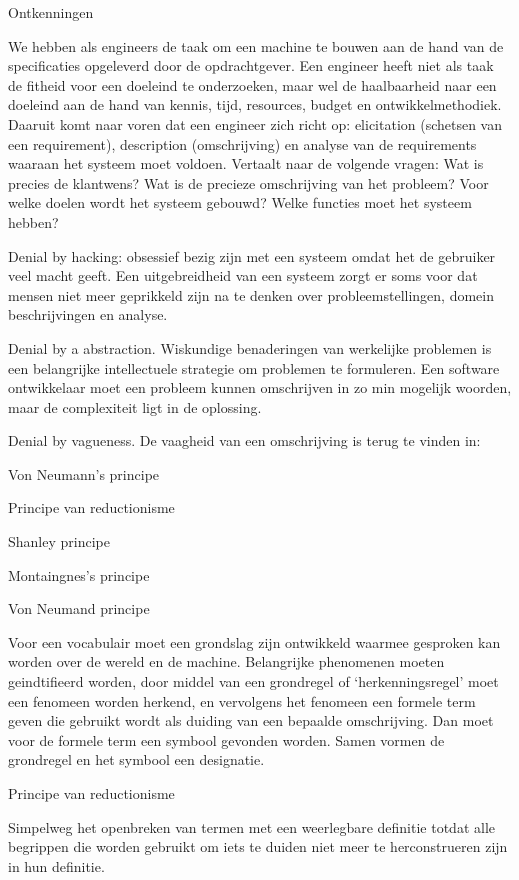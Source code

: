 Ontkenningen 

We hebben als engineers de taak om een machine te bouwen aan de hand van de specificaties opgeleverd door de opdrachtgever. Een engineer heeft niet als taak de fitheid voor een doeleind te onderzoeken, maar wel de haalbaarheid naar een doeleind aan de hand van kennis, tijd, resources, budget en ontwikkelmethodiek. Daaruit komt naar voren dat een engineer zich richt op: elicitation (schetsen van een requirement), description (omschrijving) en analyse van de requirements waaraan het systeem moet voldoen. Vertaalt naar de volgende vragen: Wat is precies de klantwens?  Wat is de precieze omschrijving van het probleem? Voor welke doelen wordt het systeem gebouwd? Welke functies moet het systeem hebben? 

Denial by hacking: obsessief bezig zijn met een systeem omdat het de gebruiker veel macht geeft. Een uitgebreidheid van een systeem zorgt er soms voor dat mensen niet meer geprikkeld zijn na te denken over probleemstellingen, domein beschrijvingen en analyse. 

Denial by a abstraction. Wiskundige benaderingen van werkelijke problemen is  een belangrijke intellectuele strategie om problemen te formuleren. Een software ontwikkelaar moet een probleem kunnen omschrijven in zo min mogelijk woorden, maar de complexiteit ligt in de oplossing. 

Denial by vagueness. De vaagheid van een omschrijving is terug te vinden in: 

Von Neumann’s principe 

Principe van reductionisme 

Shanley principe 

Montaingnes’s principe 

Von Neumand principe 

Voor een vocabulair  moet een grondslag zijn ontwikkeld waarmee gesproken kan worden over de wereld en de machine. Belangrijke phenomenen moeten geindtifieerd worden, door middel van een grondregel  of ‘herkenningsregel’ moet een fenomeen worden herkend, en vervolgens het fenomeen een formele term geven die gebruikt wordt als duiding van een bepaalde omschrijving. Dan moet voor de formele term een symbool gevonden worden. Samen vormen de grondregel en het symbool een designatie. 

Principe van reductionisme 

Simpelweg het openbreken van termen met een weerlegbare definitie totdat alle begrippen die worden gebruikt om iets te duiden  niet meer te herconstrueren zijn in hun definitie. 

